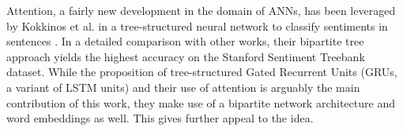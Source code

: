 Attention, a fairly new development in the domain of ANNs, has been leveraged by Kokkinos et al. in a tree-structured neural network to classify sentiments in sentences \cite{kokkinos2017structural}. In a detailed comparison with other works, their bipartite tree approach yields the highest accuracy on the Stanford Sentiment Treebank dataset. While the proposition of tree-structured Gated Recurrent Units (GRUs, a variant of LSTM units) and their use of attention is arguably the main contribution of this work, they make use of a bipartite network architecture and word embeddings as well. This gives further appeal to the idea.
